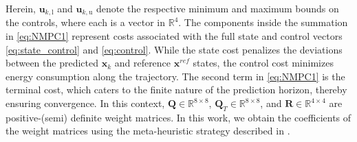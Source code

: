 Herein, $\mathbf{u}_{k,\textrm{l}}$ and $\mathbf{u}_{k,\textrm{u}}$ denote the respective minimum and maximum bounds on the controls, where each is a vector in $\mathbb{R}^{4}$. The components inside the summation in \eqref{eq:NMPC1} represent costs associated with the full state and control vectors \eqref{eq:state_control} and \eqref{eq:control}. While the state cost penalizes the deviations between the predicted $\mathbf{x}_k$  and reference $\mathbf{x}^{ref}$ states, the control cost minimizes energy consumption along the trajectory. The second term in \eqref{eq:NMPC1} is the terminal cost, which caters to the finite nature of the prediction horizon, thereby ensuring convergence.  In this context, $ \mathbf{Q} \in \mathbb{R}^ {8 \times 8} $, $  \mathbf{Q}_{T} \in \mathbb{R}^ {8 \times 8}$,  and $  \mathbf{R} \in \mathbb{R}^ {4 \times 4} $ are positive-(semi) definite weight matrices. In this work, we obtain the coefficients of the weight matrices using the meta-heuristic strategy described in \cite{mpc_tune}.


